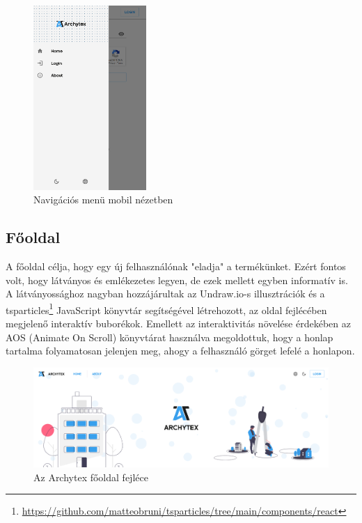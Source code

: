 \begin{figure}[h]
  \centering
  \includegraphics[height=7cm]{parts/developer-documentation/frontend/images/mobile-view.png}
  \caption{Navigációs menü mobil nézetben}
\end{figure}

\subsection{Főoldal}
A főoldal célja, hogy egy új felhasználónak "eladja" a termékünket. Ezért fontos volt, hogy látványos és emlékezetes legyen, de ezek mellett egyben informatív is. A látványossághoz nagyban hozzájárultak az Undraw.io-s illusztrációk és a tsparticles\footnote{\url{https://github.com/matteobruni/tsparticles/tree/main/components/react}} JavaScript könyvtár segítségével létrehozott, az oldal fejlécében megjelenő interaktív buborékok. Emellett az interaktivitás növelése érdekében az AOS (Animate On Scroll) könyvtárat használva megoldottuk, hogy a honlap tartalma folyamatosan jelenjen meg, ahogy a felhasználó görget lefelé a honlapon.

\begin{figure}[h]
  \centering
  \includegraphics[width=\textwidth]{parts/developer-documentation/frontend/images/header.png}
  \caption{Az Archytex főoldal fejléce}
\end{figure}

